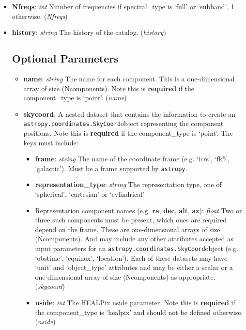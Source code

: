 \documentclass[11pt, oneside]{article}
\begin{document}
\begin{itemize}
\item \textbf{Nfreqs}: \textit{int}
Number of frequencies if spectral_type is `full' or `subband', 1 otherwise. (\textit{Nfreqs})

\item \textbf{history}: \textit{string} The history of the catalog. (\textit{history})



\subsection{Optional Parameters}
\label{sec:opt_params}
\begin{itemize}
\item \textbf{name}: \textit{string} The name for each component. This is a one-dimensional array of size (Ncomponents).
Note this is \textbf{required} if the component\_type is `point'. (\textit{name})

\item \textbf{skycoord}:
A nested dataset that contains the information to create an \verb+astropy.coordinates.SkyCoord+object representing the component positions.
Note this is \textbf{required} if the component\_type is `point'. The keys must include:
	\begin{itemize}
	\item \textbf{frame}: \textit{string} The name of the coordinate frame (e.g. `icrs', `fk5', `galactic'). Must be a frame supported by \verb+astropy+.
	\item \textbf{representation\_type}: \textit{string} The representation type, one of `spherical', `cartesian' or `cylindrical'
	\item Representation component names (e.g. \textbf{ra}, \textbf{dec}, \textbf{alt}, \textbf{az}): \textit{float} Two or three such components must be present, 	which ones are required depend on the frame. These are one-dimensional arrays of size (Ncomponents).
And may include any other attributes accepted as input parameters for an \verb+astropy.coordinates.SkyCoord+object (e.g. `obstime', `equinox', `location').
Each of these datasets may have `unit' and `object\_type' attributes and may be either a scalar or a one-dimensional array of size (Ncomponents) as appropriate.
(\textit{skycoord})

\item \textbf{nside}: \textit{int}
The HEALPix nside parameter. Note this is \textbf{required} if the component\_type is `healpix' and should not be defined otherwise. (\textit{nside})


\end{itemize}
\end{itemize}
\end{itemize}
\end{document}
